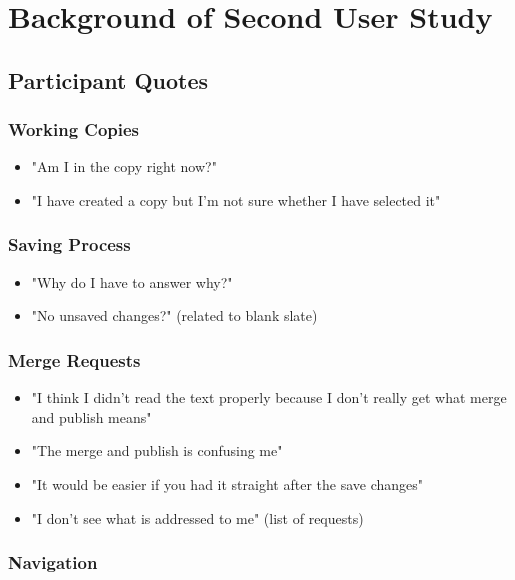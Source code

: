 \chapter{Background of Second User Study} 

\section{Participant Quotes} \label{appendix:quotes}

\subsection{Working Copies}

\begin{itemize}
 \item "Am I in the copy right now?"
 \item "I have created a copy but I'm not sure whether I have selected it"
\end{itemize}

\subsection{Saving Process}

\begin{itemize}
 \item "Why do I have to answer why?"
 \item "No unsaved changes?" (related to blank slate)
\end{itemize}

\subsection{Merge Requests}

\begin{itemize}
 \item "I think I didn't read the text properly because I don’t really get what merge and publish means"
 \item "The merge and publish is confusing me"
 \item "It would be easier if you had it straight after the save changes" 
 \item "I don't see what is addressed to me" (list of requests)
\end{itemize}

\subsection{Navigation}

